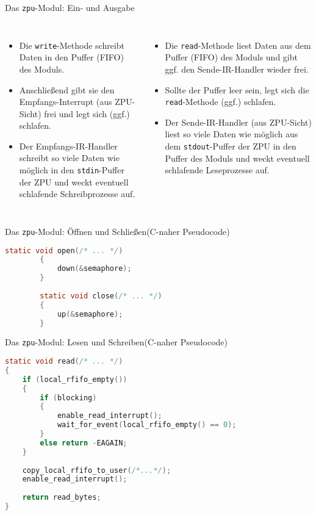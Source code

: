 \documentclass[10pt]{beamer}
\begin{document}
	\begin{frame}{Das \texttt{zpu}-Modul: Ein- und Ausgabe}
	\begin{columns}
		\begin{itemize}
			\item Die \texttt{write}-Methode schreibt Daten in den Puffer (FIFO) des Moduls.
			\item Anschließend gibt sie den Empfangs-Interrupt (aus ZPU-Sicht) frei und legt sich (ggf.) schlafen.
			\item Der Empfangs-IR-Handler schreibt so viele Daten wie möglich in den \texttt{stdin}-Puffer der ZPU und weckt eventuell schlafende Schreibprozesse auf.
		\end{itemize}
		\begin{itemize}
			\item Die \texttt{read}-Methode liest Daten aus dem Puffer (FIFO) des Moduls und gibt ggf. den Sende-IR-Handler wieder frei.
			\item Sollte der Puffer leer sein, legt sich die \texttt{read}-Methode (ggf.) schlafen.
			\item Der Sende-IR-Handler (aus ZPU-Sicht) liest so viele Daten wie möglich aus dem \texttt{stdout}-Puffer der ZPU in den Puffer des Moduls und weckt eventuell schlafende Leseprozesse auf.
		\end{itemize}
	\end{columns}
	\end{frame}
	
	\begin{frame}[fragile]{Das \texttt{zpu}-Modul: Öffnen und Schließen}{(C-naher Pseudocode)}
		\begin{lstlisting}[language=C]
		static void open(/* ... */)
		{
		    down(&semaphore);
		}
		
		static void close(/* ... */)
		{
		    up(&semaphore);
		}
		\end{lstlisting}
	\end{frame}
	
	\begin{frame}[fragile]{Das \texttt{zpu}-Modul: Lesen und Schreiben}{(C-naher Pseudocode)}
		\begin{lstlisting}[language=C]
static void read(/* ... */)
{
    if (local_rfifo_empty())
    {
        if (blocking)
        {
            enable_read_interrupt();
            wait_for_event(local_rfifo_empty() == 0);
        }
        else return -EAGAIN;
    }
		    
    copy_local_rfifo_to_user(/*...*/);
    enable_read_interrupt();
		    
    return read_bytes;
}
		\end{lstlisting}
	\end{frame}
		
\end{document}
